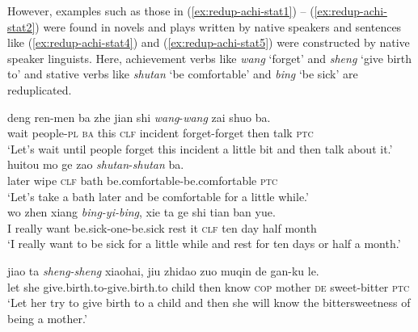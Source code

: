 \documentclass[11pt,a4paper,fleqn,draft]{article}
\let\textbf\emph
\begin{document}
However, examples such as those in (\ref{ex:redup-achi-stat1}) -- (\ref{ex:redup-achi-stat2}) were found in novels and plays written by native speakers and  sentences like (\ref{ex:redup-achi-stat4}) and (\ref{ex:redup-achi-stat5}) were constructed by native speaker linguists.
Here, achievement verbs like \emph{wang} `forget' and \emph{sheng} `give birth to' and stative verbs like \emph{shutan} `be comfortable' and \emph{bing} `be sick' are reduplicated.

\ea
\ea\label{ex:redup-achi-stat1}
\gll deng ren-men ba zhe jian shi \textbf{wang}-\textbf{wang} zai shuo ba.\footnotemark\\
wait people-\textsc{pl} \textsc{ba} this \textsc{clf} incident forget-forget then talk \textsc{ptc}\\
\glt `Let's wait until people forget this incident a little bit and then talk about it.'\\

\ex\label{ex:redup-achi-stat2}
\gll huitou mo ge zao \textbf{shutan}-\textbf{shutan} ba.\footnotemark\\
later wipe \textsc{clf} bath be.comfortable-be.comfortable \textsc{ptc}\\
\glt `Let's take a bath later and be comfortable for a little while.'\\

\ex\label{ex:redup-achi-stat4}
\gll wo zhen xiang \textbf{bing-yi-bing}, xie ta ge shi tian ban yue.\\
I really want be.sick-one-be.sick rest it \textsc{clf} ten day half month\\ 
\glt `I really want to be sick for a little while and rest for ten days or half a month.'

\ex\label{ex:redup-achi-stat5}
\gll jiao ta \textbf{sheng-sheng} xiaohai, jiu zhidao zuo muqin de gan-ku le.\\
let she give.birth.to-give.birth.to child then know \textsc{cop} mother \textsc{de} sweet-bitter \textsc{ptc}\\ 
\glt `Let her try to give birth to a child and then she will know the bittersweetness of being a mother.'
\z
\z
\end{document}
